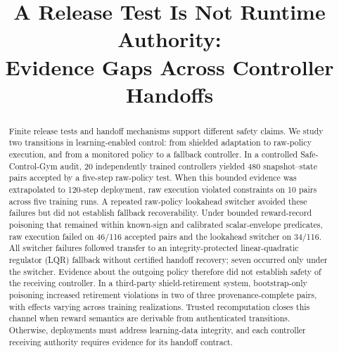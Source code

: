 \documentclass[letterpaper,twocolumn,10pt]{article}
\begin{document}
\date{}

\title{\Large \bf A Release Test Is Not Runtime Authority:\\
  Evidence Gaps Across Controller Handoffs}

\author{}

\maketitle

\begin{abstract}
Finite release tests and handoff mechanisms support different safety claims.
We study two transitions in learning-enabled control: from shielded adaptation
to raw-policy execution, and from a monitored policy to a fallback controller.
In a controlled Safe-Control-Gym audit, 20 independently trained controllers
yielded 480 snapshot--state pairs accepted by a five-step raw-policy test.  When
this bounded evidence was extrapolated to 120-step deployment, raw execution
violated constraints on 10 pairs across five training runs.  A repeated
raw-policy lookahead switcher avoided these failures but did not establish
fallback recoverability.  Under bounded reward-record poisoning that remained
within known-sign and calibrated scalar-envelope predicates, raw execution
failed on 46/116 accepted pairs and the lookahead switcher on 34/116.  All
switcher failures followed transfer to an integrity-protected linear-quadratic
regulator (LQR) fallback without certified handoff recovery; seven occurred
only under the switcher.  Evidence about the outgoing policy therefore did not
establish safety of the receiving controller.  In a third-party
shield-retirement system, bootstrap-only poisoning increased retirement
violations in two of three provenance-complete pairs, with effects varying
across training realizations.  Trusted recomputation closes this channel when
reward semantics are derivable from authenticated transitions.  Otherwise,
deployments must address learning-data integrity, and each
controller receiving authority requires evidence for its handoff contract.
\end{abstract}









\end{document}
